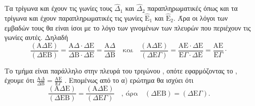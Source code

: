 \begin{alist}
    \item Τα τρίγωνα \Delta{} και \Delta{} έχουν τις γωνίες τους $\hat{\Delta}_1$ και $\hat{\Delta}_2$ παραπληρωματικές όπως και τα τρίγωνα \Delta{} και \Delta{}\Gamma έχουν παραπληρωματικές τις γωνίες $\hat{\text{E}}_1$ και $\hat{\text{E}}_2$. Άρα οι λόγοι των εμβαδών τους θα είναι ίσοι με το λόγο των γινομένων των πλευρών που περιέχουν τις γωνίες αυτές. Δηλαδή
    \[ \frac{(\text{A}\Delta\text{E})}{(\Delta\text{E}\text{B})} = \frac{\text{A}\Delta \cdot \Delta\text{E}}{\Delta\text{B} \cdot \Delta\text{E}} = \frac{\text{A}\Delta}{\Delta\text{B}} \quad \text{και} \quad \frac{(\text{A}\Delta\text{E})}{(\Delta\text{E}\Gamma)} = \frac{\text{A}\text{E} \cdot \Delta\text{E}}{\text{E}\Gamma \cdot \Delta\text{E}} = \frac{\text{A}\text{E}}{\text{E}\Gamma} \cdot \]

    \item Το τμήμα \Delta{} είναι παράλληλο στην πλευρά \Gamma του τριγώνου \Gamma, οπότε εφαρμόζοντας το
    , έχουμε ότι $\frac{\text{A}\Delta}{\Delta\text{B}} = \frac{\text{A}\text{E}}{\text{E}\Gamma}$ . Επομένως από το α) ερώτημα θα ισχύει ότι
    \[ \frac{(\text{A}\Delta\text{E})}{(\Delta\text{E}\text{B})} = \frac{(\text{A}\Delta\text{E})}{(\Delta\text{E}\Gamma)} \quad \text{, άρα} \quad (\Delta\text{E}\text{B}) = (\Delta\text{E}\Gamma). \]
\end{alist}